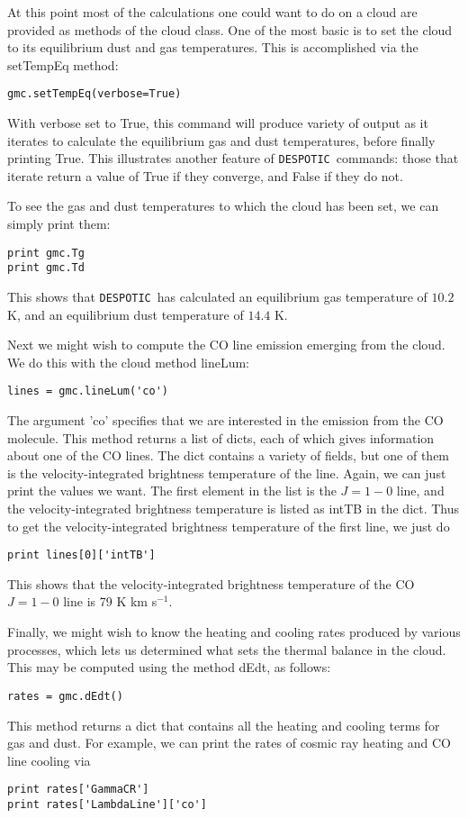 \documentclass[12pt]{article}
\newcommand{\despotic}{\texttt{DESPOTIC}}
\begin{document}
At this point most of the calculations one could want to do on a cloud are provided as methods of the cloud class. One of the most basic is to set the cloud to its equilibrium dust and gas temperatures. This is accomplished via the setTempEq method:
\begin{verbatim}
gmc.setTempEq(verbose=True)
\end{verbatim}
With verbose set to True, this command will produce variety of output as it iterates to calculate the equilibrium gas and dust temperatures, before finally printing True. This illustrates another feature of \despotic\ commands: those that iterate return a value of True if they converge, and False if they do not.

To see the gas and dust temperatures to which the cloud has been set, we can simply print them:
\begin{verbatim}
print gmc.Tg
print gmc.Td
\end{verbatim}
This shows that \despotic\ has calculated an equilibrium gas temperature of $10.2$ K, and an equilibrium dust temperature of $14.4$ K.

Next we might wish to compute the CO line emission emerging from the cloud. We do this with the cloud method lineLum:
\begin{verbatim}
lines = gmc.lineLum('co')
\end{verbatim}
The argument 'co' specifies that we are interested in the emission from the CO molecule. This method returns a list of dicts, each of which gives information about one of the CO lines. The dict contains a variety of fields, but one of them is the velocity-integrated brightness temperature of the line. Again, we can just print the values we want. The first element in the list is the $J=1-0$ line, and the velocity-integrated brightness temperature is listed as intTB in the dict. Thus to get the velocity-integrated brightness temperature of the first line, we just do
\begin{verbatim}
print lines[0]['intTB']
\end{verbatim}
This shows that the velocity-integrated brightness temperature of the CO $J=1-0$ line is 79 K km s$^{-1}$.

Finally, we might wish to know the heating and cooling rates produced by various processes, which lets us determined what sets the thermal balance in the cloud. This may be computed using the method dEdt, as follows:
\begin{verbatim}
rates = gmc.dEdt()
\end{verbatim}
This method returns a dict that contains all the heating and cooling terms for gas and dust. For example, we can print the rates of cosmic ray heating and CO line cooling via
\begin{verbatim}
print rates['GammaCR']
print rates['LambdaLine']['co']
\end{verbatim}
\end{document}
